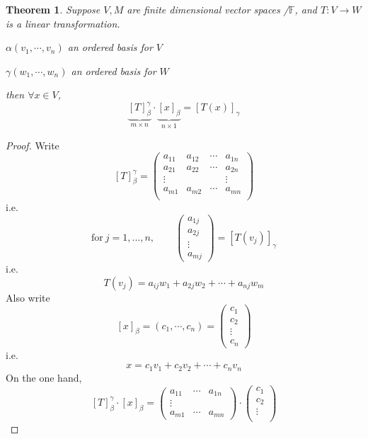 \documentclass[12pt]{article}
\newtheorem{theorem}{Theorem}[subsection]
\newcommand{\mF}{{\mathbb{F}}}
\begin{document}
	\begin{theorem}
		Suppose $V, M$ are finite dimensional vector spaces /$\mF$, and 
		$T: V\to W$ is a linear transformation. 
		\begin{description}
			\item $\alpha(v_1,\cdots, v_n)$ an ordered basis for $V$
			\item $\gamma(w_1,\cdots, w_n)$ an ordered basis for $W$
		\end{description}
		then $\forall x \in V$, 
		\[
			\underbrace{[T]_{\beta}^{\gamma}}_{m\times n}\cdot
			\underbrace{[x]_{\beta}}_{n\times 1}=[T(x)]_{\gamma}
		\]
	\end{theorem}
	\begin{proof}
		Write 
		\[
			[T]_{\beta}^{\gamma} = 
			\begin{pmatrix}
				a_{11} & a_{12} & \cdots & a_{1n} \\
				a_{21} & a_{22} & \cdots & a_{2n} \\
				\vdots & & & \vdots\\
				a_{m1} & a_{m2} & \cdots & a_{mn} \\
			\end{pmatrix}
		\]
		i.e.
		\[
		\text{for} \ j = 1, ..., n, \qquad 
		\begin{pmatrix}
			a_{1j}\\
			a_{2j}\\
			\vdots\\
			a_{mj}
		\end{pmatrix}
		= [T(v_j)]_{\gamma}
		\]
		i.e. 
		\[
			T(v_j) = a_{ij}w_1 + a_{2j}w_2 + \cdots + a_{nj}w_m
		\]
		Also write 
		\[
			[x]_{\beta} = (c_1,\cdots, c_n) = 
			\begin{pmatrix}
				c_1\\
				c_2\\
				\vdots\\
				c_n
			\end{pmatrix}
		\]
		i.e.
		\[
			x = c_1v_1 + c_2v_2 + \cdots + c_nv_n
		\]
		On the one hand, 
		\[
			[T]^{\gamma}_{\beta} \cdot [x]_{\beta} = 
			\begin{pmatrix}
				a_{11} & \cdots & a_{1n}\\
				\vdots & & \\
				a_{m1} & \cdots & a_{mn} 
			\end{pmatrix}
			\cdot 
			\begin{pmatrix}
				c_1\\
				c_2\\
				\vdots\\

\end{pmatrix}\]
\end{proof}
\end{document}
